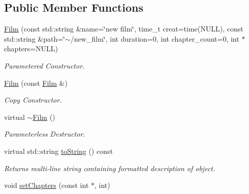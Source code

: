\subsection*{Public Member Functions}
\begin{DoxyCompactItemize}
\item 
\hypertarget{classFilm_a704092a2bb7629c5bf053c8011e148ee}{\hyperlink{classFilm_a704092a2bb7629c5bf053c8011e148ee}{Film} (const std\+::string \&name=\char`\"{}new film\char`\"{}, time\+\_\+t creat=time(N\+U\+L\+L), const std\+::string \&path=\char`\"{}$\sim$/new\+\_\+film\char`\"{}, int duration=0, int chapter\+\_\+count=0, int $\ast$chapters=N\+U\+L\+L)}\label{classFilm_a704092a2bb7629c5bf053c8011e148ee}

\begin{DoxyCompactList}\small\item\em Parametered Constructor. \end{DoxyCompactList}\item 
\hypertarget{classFilm_a34c9de2efb9554ce1192e4110d98806b}{\hyperlink{classFilm_a34c9de2efb9554ce1192e4110d98806b}{Film} (const \hyperlink{classFilm}{Film} \&)}\label{classFilm_a34c9de2efb9554ce1192e4110d98806b}

\begin{DoxyCompactList}\small\item\em Copy Constructor. \end{DoxyCompactList}\item 
virtual \hyperlink{classFilm_a8dab653f8a6c0635ca5ddbe0bbdd9a25}{$\sim$\+Film} ()
\begin{DoxyCompactList}\small\item\em Parameterless Destructor. \end{DoxyCompactList}\item 
\hypertarget{classFilm_ab88f7ac028cd45da81c96a50a2990fee}{virtual std\+::string \hyperlink{classFilm_ab88f7ac028cd45da81c96a50a2990fee}{to\+String} () const }\label{classFilm_ab88f7ac028cd45da81c96a50a2990fee}

\begin{DoxyCompactList}\small\item\em Returns multi-\/line string containing formatted description of object. \end{DoxyCompactList}\item 
\hypertarget{classFilm_ab0c2831b76a6b932dfc4a6facc38870c}{void \hyperlink{classFilm_ab0c2831b76a6b932dfc4a6facc38870c}{set\+Chapters} (const int $\ast$, int)}\label{classFilm_ab0c2831b76a6b932dfc4a6facc38870c}


\end{DoxyCompactItemize}
